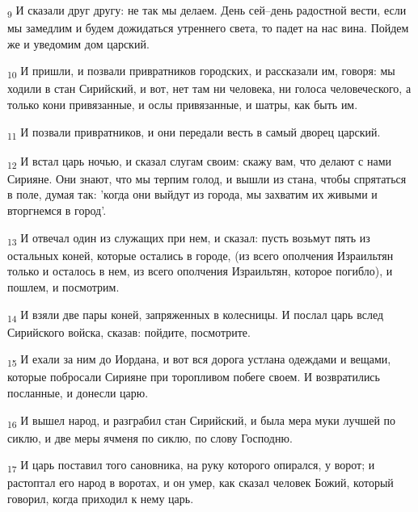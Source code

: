 \begin{tcolorbox}
\textsubscript{9} И сказали друг другу: не так мы делаем. День сей--день радостной вести, если мы замедлим и будем дожидаться утреннего света, то падет на нас вина. Пойдем же и уведомим дом царский.
\end{tcolorbox}
\begin{tcolorbox}
\textsubscript{10} И пришли, и позвали привратников городских, и рассказали им, говоря: мы ходили в стан Сирийский, и вот, нет там ни человека, ни голоса человеческого, а только кони привязанные, и ослы привязанные, и шатры, как быть им.
\end{tcolorbox}
\begin{tcolorbox}
\textsubscript{11} И позвали привратников, и они передали весть в самый дворец царский.
\end{tcolorbox}
\begin{tcolorbox}
\textsubscript{12} И встал царь ночью, и сказал слугам своим: скажу вам, что делают с нами Сирияне. Они знают, что мы терпим голод, и вышли из стана, чтобы спрятаться в поле, думая так: 'когда они выйдут из города, мы захватим их живыми и вторгнемся в город'.
\end{tcolorbox}
\begin{tcolorbox}
\textsubscript{13} И отвечал один из служащих при нем, и сказал: пусть возьмут пять из остальных коней, которые остались в городе, (из всего ополчения Израильтян только и осталось в нем, из всего ополчения Израильтян, которое погибло), и пошлем, и посмотрим.
\end{tcolorbox}
\begin{tcolorbox}
\textsubscript{14} И взяли две пары коней, запряженных в колесницы. И послал царь вслед Сирийского войска, сказав: пойдите, посмотрите.
\end{tcolorbox}
\begin{tcolorbox}
\textsubscript{15} И ехали за ним до Иордана, и вот вся дорога устлана одеждами и вещами, которые побросали Сирияне при торопливом побеге своем. И возвратились посланные, и донесли царю.
\end{tcolorbox}
\begin{tcolorbox}
\textsubscript{16} И вышел народ, и разграбил стан Сирийский, и была мера муки лучшей по сиклю, и две меры ячменя по сиклю, по слову Господню.
\end{tcolorbox}
\begin{tcolorbox}
\textsubscript{17} И царь поставил того сановника, на руку которого опирался, у ворот; и растоптал его народ в воротах, и он умер, как сказал человек Божий, который говорил, когда приходил к нему царь.
\end{tcolorbox}
